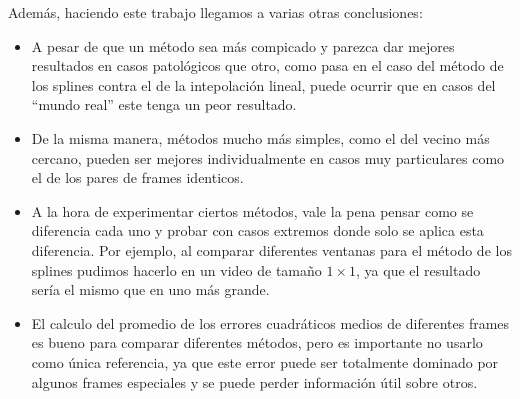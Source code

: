 \vspace{1em}

Adem\'as, haciendo este trabajo llegamos a varias otras conclusiones:

\vspace{-2ex}

\begin{itemize}
	\item A pesar de que un m\'etodo sea m\'as compicado y parezca dar mejores resultados en casos patol\'ogicos que otro, como pasa en el caso del m\'etodo de los splines contra el de la intepolaci\'on lineal, puede ocurrir que en casos del ``mundo real'' este tenga un peor resultado.
	\item De la misma manera, m\'etodos mucho m\'as simples, como el del vecino m\'as cercano, pueden ser mejores individualmente en casos muy particulares como el de los pares de frames identicos.
	\item A la hora de experimentar ciertos m\'etodos, vale la pena pensar como se diferencia cada uno y probar con casos extremos donde solo se aplica esta diferencia. Por ejemplo, al comparar diferentes ventanas para el m\'etodo de los splines pudimos hacerlo en un video de tama\~no \(1 \times 1\), ya que el resultado ser\'ia el mismo que en uno m\'as grande.
	\item El calculo del promedio de los errores cuadr\'aticos medios de diferentes frames es bueno para comparar diferentes m\'etodos, pero es importante no usarlo como \'unica referencia, ya que este error puede ser totalmente dominado por algunos frames especiales y se puede perder informaci\'on \'util sobre otros.
\end{itemize}
